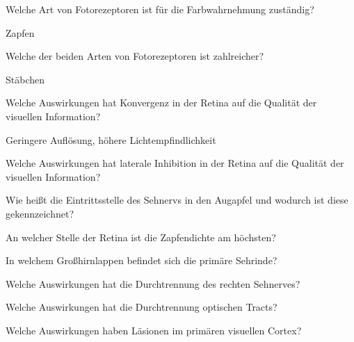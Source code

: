 \documentclass[10pt, a4paper]{exam}
\begin{document}
\begin{questions}
  \question Welche Art von Fotorezeptoren ist für die Farbwahrnehmung zuständig?
  \begin{solution}
    Zapfen
  \end{solution}

  \question Welche der beiden Arten von Fotorezeptoren ist zahlreicher?
  \begin{solution}
    Stäbchen
  \end{solution}

  \question Welche Auswirkungen hat Konvergenz in der Retina auf die Qualität der visuellen Information?
  \begin{solution}
    Geringere Auflösung, höhere Lichtempfindlichkeit
  \end{solution}

  \question Welche Auswirkungen hat laterale Inhibition in der Retina auf die Qualität der visuellen Information?
  \begin{solution}

  \end{solution}

  \question Wie heißt die Eintrittsstelle des Sehnervs in den Augapfel und wodurch ist diese gekennzeichnet?
  \begin{solution}

  \end{solution}

  \question An welcher Stelle der Retina ist die Zapfendichte am höchsten?
  \begin{solution}

  \end{solution}

  \question In welchem Großhirnlappen befindet sich die primäre Sehrinde?
  \begin{solution}

  \end{solution}

  \question Welche Auswirkungen hat die Durchtrennung des rechten Sehnerves?
  \begin{solution}

  \end{solution}

  \question Welche Auswirkungen hat die Durchtrennung optischen Tracts?
  \begin{solution}

  \end{solution}

  \question Welche Auswirkungen haben Läsionen im primären visuellen Cortex?
  \begin{solution}


\end{solution}
\end{questions}
\end{document}
